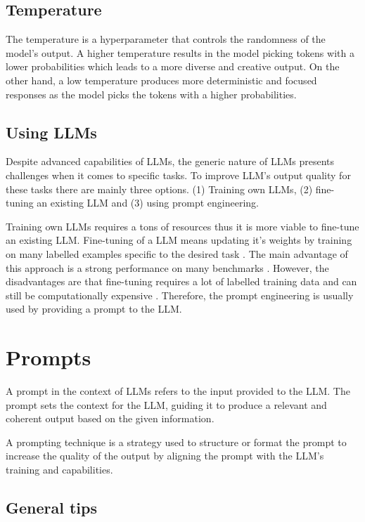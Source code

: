 \subsection{Temperature}
\label{temperature}
The temperature is a hyperparameter that controls the randomness of the model's output. A higher temperature results in the model picking tokens with a lower probabilities which leads to a more diverse and creative output. On the other hand, a low temperature produces more deterministic and focused responses as the model picks the tokens with a higher probabilities.


\subsection{Using LLMs}

Despite advanced capabilities of LLMs, the generic nature of LLMs presents challenges when it comes to specific tasks. To improve LLM's output quality for these tasks there are mainly three options. (1) Training own LLMs, (2) fine-tuning an existing LLM and (3) using prompt engineering.

Training own LLMs requires a tons of resources thus it is more viable to fine-tune an existing LLM. Fine-tuning of a LLM means updating it's weights by training on many labelled examples specific to the desired task \cite{Brown2020}. The main advantage of this approach is a strong performance on many benchmarks \cite{Brown2020}. However, the disadvantages are that fine-tuning requires a lot of labelled training data and can still be computationally expensive \cite{Brown2020}. Therefore, the prompt engineering is usually used by providing a prompt to the LLM.


\section{Prompts}

A prompt in the context of LLMs refers to the input provided to the LLM. The prompt sets the context for the LLM, guiding it to produce a relevant and coherent output based on the given information.

A prompting technique is a strategy used to structure or format the prompt to increase the quality of the output by aligning the prompt with the LLM's training and capabilities.


\subsection{General tips}
\label{prompt_general_tips}

